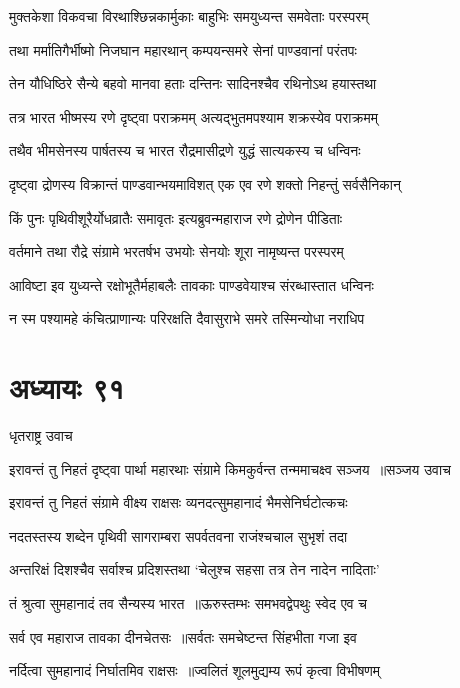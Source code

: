 \twolineshloka
{मुक्तकेशा विकवचा विरथाश्छिन्नकार्मुकाः}
{बाहुभिः समयुध्यन्त समवेताः परस्परम्}


\twolineshloka
{तथा मर्मातिगैर्भीष्मो निजघान महारथान्}
{कम्पयन्समरे सेनां पाण्डवानां परंतपः}


\twolineshloka
{तेन यौधिष्ठिरे सैन्ये बहवो मानवा हताः}
{दन्तिनः सादिनश्चैव रथिनोऽथ हयास्तथा}


\twolineshloka
{तत्र भारत भीष्मस्य रणे दृष्ट्वा पराक्रमम्}
{अत्यद्भुतमपश्याम शक्रस्येव पराक्रमम्}


\twolineshloka
{तथैव भीमसेनस्य पार्षतस्य च भारत}
{रौद्रमासीद्रणे युद्धं सात्यकस्य च धन्विनः}


\twolineshloka
{दृष्ट्वा द्रोणस्य विक्रान्तं पाण्डवान्भयमाविशत्}
{एक एव रणे शक्तो निहन्तुं सर्वसैनिकान्}


\twolineshloka
{किं पुनः पृथिवीशूरैर्योधव्रातैः समावृतः}
{इत्यब्रुवन्महाराज रणे द्रोणेन पीडिताः}


\twolineshloka
{वर्तमाने तथा रौद्रे संग्रामे भरतर्षभ}
{उभयोः सेनयोः शूरा नामृष्यन्त परस्परम्}


\twolineshloka
{आविष्टा इव युध्यन्ते रक्षोभूतैर्महाबलैः}
{तावकाः पाण्डवेयाश्च संरब्धास्तात धन्विनः}


\twolineshloka
{न स्म पश्यामहे कंचित्प्राणान्यः परिरक्षति}
{दैवासुराभे समरे तस्मिन्योधा नराधिप}


\chapter{अध्यायः ९१}
\twolineshloka
{धृतराष्ट्र उवाच}
{}


\threelineshloka
{इरावन्तं तु निहतं दृष्ट्वा पार्था महारथाः}
{संग्रामे किमकुर्वन्त तन्ममाचक्ष्व सञ्जय ॥सञ्जय उवाच}
{}


\twolineshloka
{इरावन्तं तु निहतं संग्रामे वीक्ष्य राक्षसः}
{व्यनदत्सुमहानादं भैमसेनिर्घटोत्कचः}


\twolineshloka
{नदतस्तस्य शब्देन पृथिवी सागराम्बरा}
{सपर्वतवना राजंश्चचाल सुभृशं तदा}


\twolineshloka
{अन्तरिक्षं दिशश्चैव सर्वाश्च प्रदिशस्तथा}
{`चेलुश्च सहसा तत्र तेन नादेन नादिताः'}


\twolineshloka
{तं श्रुत्वा सुमहानादं तव सैन्यस्य भारत ॥ऊरुस्तम्भः समभवद्वेपथुः स्वेद एव च}
{}


\twolineshloka
{सर्व एव महाराज तावका दीनचेतसः ॥सर्वतः समचेष्टन्त सिंहभीता गजा इव}
{}


\twolineshloka
{नर्दित्वा सुमहानादं निर्घातमिव राक्षसः ॥ज्वलितं शूलमुद्यम्य रूपं कृत्वा विभीषणम्}
{}


